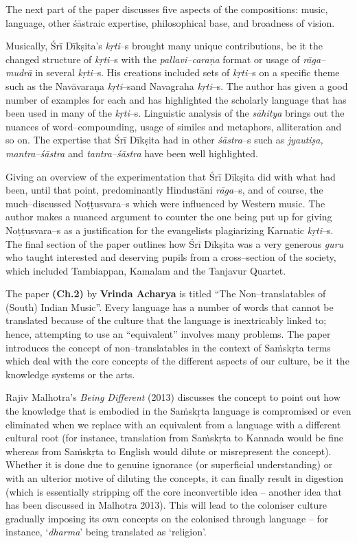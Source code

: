 The next part of the paper discusses five aspects of the compositions: music, language, other śāstraic expertise, philosophical base, and broadness of vision.

Musically, Śrī Dīkṣita’s \textit{kṛti}–s brought many unique contributions, be it the changed structure of \textit{kṛti}–s with the \textit{pallavi–caraṇa} format or usage of \textit{rāga–mudrā} in several \textit{kṛti}–s. His creations included sets of \textit{kṛti}–s on a specific theme such as the Navāvaraṇa \textit{kṛti}–s\break and Navagraha \textit{kṛti}–s. The author has given a good number of examples for each and has highlighted the scholarly language that has been used in many of the \textit{kṛti}–s. Linguistic analysis of the \textit{sāhitya} brings out the nuances of word–compounding, usage of similes and metaphors, alliteration and so on. The expertise that Śrī Dīkṣita had in other \textit{śāstra}–s such as \textit{jyautiṣa, mantra–śāstra} and \textit{tantra–śāstra} have been well highlighted.

Giving an overview of the experimentation that Śrī Dīkṣita did with what had been, until that point, predominantly Hindustāni \textit{rāga}–s, and of course, the much–discussed Noṭṭusvara–s which were influenced by Western music. The author makes a nuanced argument to counter the one being put up for giving Noṭṭusvara–s as a justification for the evangelists plagiarizing Karnatic \textit{kṛti}–s. The final section of the paper outlines how Śrī Dīkṣita was a very generous \textit{guru} who taught interested and deserving pupils from a cross–section of the society, which included Tambiappan, Kamalam and the Tanjavur Quartet.

The paper \textbf{(Ch.2)} by \textbf{Vrinda Acharya} is titled “The Non–translatables of (South) Indian Music”. Every language has a number of words that cannot be translated because of the culture that the language is inextricably linked to; hence, attempting to use an “equivalent” involves many problems. The paper introduces the concept of non–translatables in the context of Saṁskṛta terms which deal with the core concepts of the different aspects of our culture, be it the knowledge systems or the arts.

Rajiv Malhotra’s \textit{Being Different} (2013) discusses the concept to point out how the knowledge that is embodied in the Saṁskṛta language is compromised or even eliminated when we replace with an equivalent from a language with a different cultural root (for instance, translation from Saṁskṛta to Kannada would be fine whereas from Saṁskṛta to English would dilute or misrepresent the concept). Whether it is done due to genuine ignorance (or superficial understanding) or with an ulterior motive of diluting the concepts, it can finally result in digestion (which is essentially stripping off the core inconvertible idea – another idea that has been discussed in Malhotra 2013). This will lead to the coloniser culture gradually imposing its own concepts on the colonised through language – for instance, ‘\textit{dharma}’ being translated as ‘religion’.


